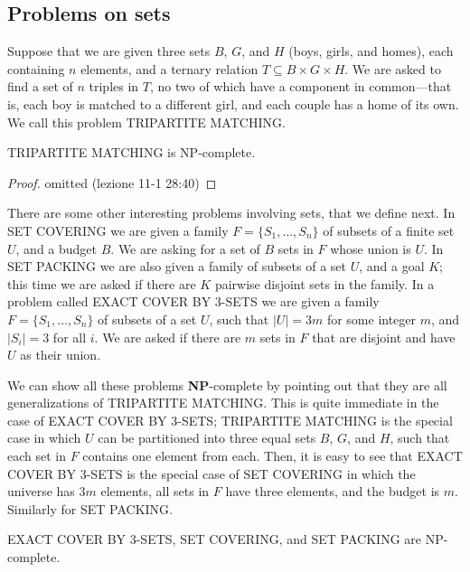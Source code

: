 \documentclass[12pt]{article}
\begin{document}
\subsection{Problems on sets}
Suppose that we are given three sets $B$, $G$, and $H$ (boys, girls, and homes), each containing $n$ elements, and a ternary relation $T \subseteq B \times G \times H$. We are asked to find a set of $n$ triples in $T$, no two of which have a component in common—that is, each boy is matched to a different girl, and each couple has a home of its own. We call this problem \textsc{TRIPARTITE MATCHING}.
\begin{defbox}[Theorem]
  \textsc{TRIPARTITE MATCHING} is NP-complete.
\end{defbox}
\begin{proof}
  omitted (lezione 11-1 28:40)
\end{proof}
There are some other interesting problems involving sets, that we define next. In \textsc{SET COVERING} we are given a family $F = \{S_1, \ldots, S_n\}$ of subsets of a finite set $U$, and a budget $B$. We are asking for a set of $B$ sets in $F$ whose union is $U$. In \textsc{SET PACKING} we are also given a family of subsets of a set $U$, and a goal $K$; this time we are asked if there are $K$ pairwise disjoint sets in the family. In a problem called \textsc{EXACT COVER BY 3-SETS} we are given a family $F = \{S_1, \ldots, S_n\}$ of subsets of a set $U$, such that $|U| = 3m$ for some integer $m$, and $|S_i| = 3$ for all $i$. We are asked if there are $m$ sets in $F$ that are disjoint and have $U$ as their union.

We can show all these problems \textbf{NP}-complete by pointing out that they are all generalizations of \textsc{TRIPARTITE MATCHING}. This is quite immediate in the case of \textsc{EXACT COVER BY 3-SETS}; \textsc{TRIPARTITE MATCHING} is the special case in which $U$ can be partitioned into three equal sets $B$, $G$, and $H$, such that each set in $F$ contains one element from each. Then, it is easy to see that \textsc{EXACT COVER BY 3-SETS} is the special case of \textsc{SET COVERING} in which the universe has $3m$ elements, all sets in $F$ have three elements, and the budget is $m$. Similarly for \textsc{SET PACKING}.
\begin{defbox}[Corollary]
\textsc{EXACT COVER BY 3-SETS}, \textsc{SET COVERING}, and \textsc{SET PACKING} are NP-complete.
\end{defbox}
\end{document}
